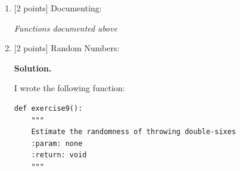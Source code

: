 \documentclass[10pt]{article}
\begin{document}
\begin{enumerate}
\begin{verbatim}

def main():
    """
    main
    :param: none
    :return: void
    """
    exercise6("../data/humu.txt", "out.txt")

def scale01(arr):
    """
    Linearly scale the values of an array in the range [0,1]
    :param arr: input ndarray
    :return: scaled ndarray
    """
    return arr / arr.max()
    
def exercise6(infile, outfile):
    """
    Read a file into a Numpy ndarray
    :param infile: the file to read
    :param outfile: where to write the output
    :return: void
    """
    dat = np.loadtxt(infile)

    scaled = scale01(dat)
    print('scaled min = {} max = {} shape = {}'.format(scaled.min(),
                                                       scaled.max(),
                                                       scaled.shape))

    plt.figure()
    plt.imshow(dat)
    plt.show()

    print(plt.cm.cmapname)

    plt.imshow(dat, cmap='gray')
    plt.show()

    for _ in range(0, 2):
        ran = np.random.random(dat.shape)
        plt.imshow(ran)
        plt.show()
        np.savetxt(outfile, ran)

    ran1 = np.loadtxt(outfile)
    plt.imshow(ran1)
    plt.show()

    print('Done.')

if __name__ == '__main__':
    main()

$ ./hw1.py
type = <class 'numpy.ndarray'>
size = 210816
shape = (366, 576)
max = 0.9450980392156862
min = 0.0
scaled min = 0.0 max = 1.0 shape = (366, 576)
tab20c_r
Done.

\end{verbatim}


\item \label{prob:8} [2 points]
Documenting:

\emph{Functions documented above}

\item \label{prob:9} [2 points]
Random Numbers:

{\bf Solution.} 

I wrote the following function:

\begin{verbatim}
def exercise9():
    """
    Estimate the randomness of throwing double-sixes
    :param: none
    :return: void
    """


\end{verbatim}
\end{enumerate}
\end{document}
